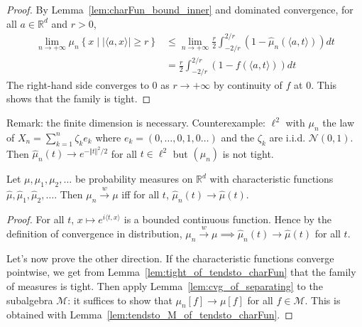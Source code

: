 \begin{proof}
\leanok
By Lemma~\ref{lem:charFun_bound_inner} and dominated convergence, for all $a \in \mathbb{R}^d$ and $r > 0$,
\begin{align*}
    \lim_{n \to +\infty} \mu_n \left\{x \mid |\langle a, x\rangle| \ge r\right\}
    &\le \lim_{n \to +\infty} \frac{r}{2} \int_{-2/r}^{2/r} (1 - \hat{\mu}_n(\langle a, t\rangle))dt
    \\
    &= \frac{r}{2} \int_{-2/r}^{2/r} (1 - f(\langle a, t\rangle))dt
\end{align*}
The right-hand side converges to 0 as $r \to +\infty$ by continuity of $f$ at 0.
This shows that the family is tight.
\end{proof}

Remark: the finite dimension is necessary.
Counterexample: $\ell^2$ with $\mu_n$ the law of $X_n = \sum_{k=1}^n \zeta_k e_k$ where $e_k = (0, \ldots, 0, 1, 0 \ldots)$ and the $\zeta_k$ are i.i.d. $\mathcal N(0,1)$.
Then $\hat{\mu}_n(t) \to e^{- \Vert t \Vert^2 / 2}$ for all $t \in \ell^2$ but $(\mu_n)$ is not tight.


\begin{theorem}
\label{thm:charFun_tendsto_iff_measure_tendsto}
\leanok
{}
Let $\mu, \mu_1, \mu_2, \ldots$ be probability measures on $\mathbb{R}^d$ with characteristic functions $\hat{\mu}, \hat{\mu}_1, \hat{\mu}_2, \ldots$. Then $\mu_n \xrightarrow{w} \mu$ iff for all $t$, $\hat{\mu}_n(t) \to \hat{\mu}(t)$.
\end{theorem}

\begin{proof}
\leanok
For all $t$, $x \mapsto e^{i \langle t, x \rangle}$ is a bounded continuous function. Hence by the definition of convergence in distribution, $\mu_n \xrightarrow{w} \mu \implies \hat{\mu}_n(t) \to \hat{\mu}(t)$ for all $t$.

Let's now prove the other direction.
If the characteristic functions converge pointwise, we get from Lemma~\ref{lem:tight_of_tendsto_charFun} that the family of measures is tight.
Then apply Lemma~\ref{lem:cvg_of_separating} to the subalgebra $\mathcal M$: it suffices to show that $\mu_n[f] \to \mu[f]$ for all $f \in \mathcal M$. This is obtained with Lemma~\ref{lem:tendsto_M_of_tendsto_charFun}.
\end{proof}